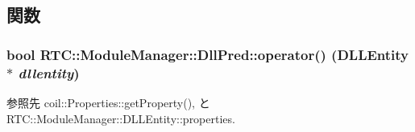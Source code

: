 \subsection{関数}
\subsubsection[{operator()}]{\setlength{\rightskip}{0pt plus 5cm}bool RTC::ModuleManager::DllPred::operator() ({\bf DLLEntity} $\ast$ {\em dllentity})\hspace{0.3cm}{\ttfamily  [inline]}}\label{classRTC_1_1ModuleManager_1_1DllPred_a8f4c3819da12b3a7b4ea1c6c566c4c92}


参照先 coil::Properties::getProperty(), と RTC::ModuleManager::DLLEntity::properties.

